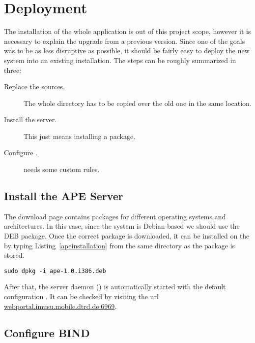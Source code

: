\section{Deployment} %
\label{sec:deployment}

The installation of the whole  application is out of this project scope, however it is necessary to explain the upgrade from a previous version.
Since one of the goals was to be as less disruptive as possible, it should be fairly easy to deploy the new system into an existing installation.
The steps can be roughly summarized in three:

\begin{description}
  \item[Replace the  sources.] The whole  directory has to be copied over the old one in the same location.
  \item[Install the  server.] This just means installing a package.
  \item[Configure .]  needs some custom rules.
\end{description}

\subsection{Install the APE Server} %
\label{sub:apeinstall}

The  download page \cite{ApeDownload} contains packages for different operating systems and architectures.
In this case, since the system is Debian-based we should use the DEB package.
Once the correct package is downloaded, it can be installed on the  by typing Listing~\vref{apeinstallation} from the same directory as the package is stored.

\begin{lstlisting}[label=apeinstallation,caption=APE installation command]
  sudo dpkg -i ape-1.0.i386.deb
\end{lstlisting}

After that, the  server daemon () is automatically started with the default configuration \cite{ApeSetup}.
It can be checked by visiting the url \url{webportal.imusu.mobile.dtrd.de:6969}.


\subsection{Configure BIND} %
\label{sub:bind}

